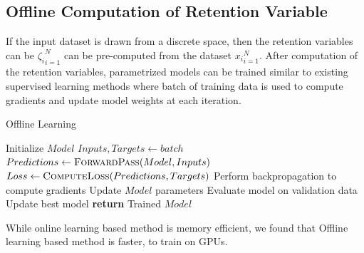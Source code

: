 \subsection{Offline Computation of Retention Variable}   

If the input dataset is drawn from a discrete space, then the retention variables can be ${\zeta_i}_{i=1}^N$ can be pre-computed from the dataset ${x_i}_{i=1}^N$. After computation of the retention variables, parametrized models can be trained similar to existing supervised learning methods where batch of training data is used to compute gradients and update model weights at each iteration.\\

 \begin{algorithm}
        \caption{Offline Learning}
        \begin{algorithmic}[1]
            \State Initialize $Model$
                    \State $Inputs, Targets \gets batch$
                    \State $Predictions \gets \Call{ForwardPass}{Model, Inputs}$
                    \State $Loss \gets \Call{ComputeLoss}{Predictions, Targets}$
                    \State Perform backpropagation to compute gradients
                    \State Update $Model$ parameters
                \EndFor
                \State Evaluate model on validation data
                    \State Update best model
                \EndIf
            \EndFor
            \State \textbf{return} Trained $Model$
        \EndProcedure
        \end{algorithmic}
        \end{algorithm}
     
While online learning based method is memory efficient, we found that Offline learning based method is faster, to train on GPUs. 














